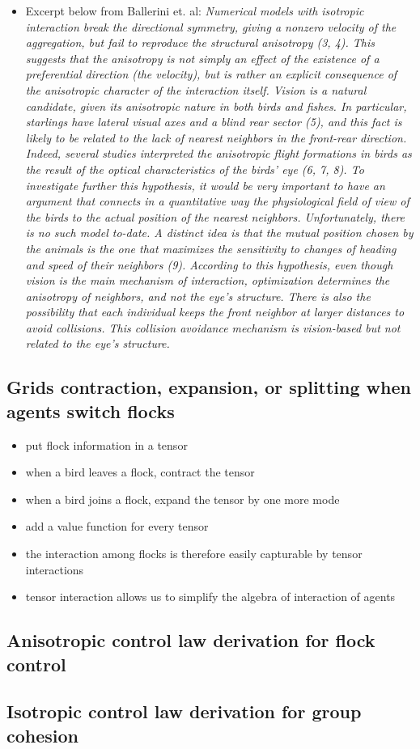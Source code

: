 \begin{itemize}
	\item Excerpt below from Ballerini et. al:
	\textit{Numerical models with isotropic interaction break the directional symmetry, giving a nonzero velocity of the aggregation, but fail to reproduce the structural anisotropy (3, 4). This suggests that the anisotropy is not simply an effect of the existence of a preferential direction (the velocity), but is rather an explicit consequence of the anisotropic character of the interaction itself. Vision is a natural candidate, given its anisotropic nature in both birds and fishes. In particular, starlings have lateral visual axes and a blind rear sector (5), and this fact is likely to be related to the lack of nearest neighbors in the front-rear direction. Indeed, several studies interpreted the anisotropic flight formations in birds as the result of the optical characteristics of the birds' eye (6, 7, 8). To investigate further this hypothesis, it would be very important to have an argument that connects in a quantitative way the physiological field of view of the birds to the actual position of the nearest neighbors. Unfortunately, there is no such model to-date. A distinct idea is that the mutual position chosen by the animals is the one that maximizes the sensitivity to changes of heading and speed of their neighbors (9). According to this hypothesis, even though vision is the main mechanism of interaction, optimization determines the anisotropy of neighbors, and not the eye's structure. There is also the possibility that each individual keeps the front neighbor at larger distances to avoid collisions. This collision avoidance mechanism is vision-based but not related to the eye's structure.
	}%
\end{itemize}

\subsection{Grids contraction, expansion, or splitting when agents switch flocks}

\begin{itemize}
	\item put flock information in a tensor 
	\item when a bird leaves a flock, contract the tensor
	\item  when a bird joins a flock, expand the tensor by one more mode
	\item add a value function for every tensor
	\item the interaction among flocks is therefore easily capturable by tensor interactions
	\item tensor interaction allows us to simplify the algebra of interaction of agents
\end{itemize}


\subsection{Anisotropic control law derivation for flock control}

\subsection{Isotropic control law derivation for group cohesion}

